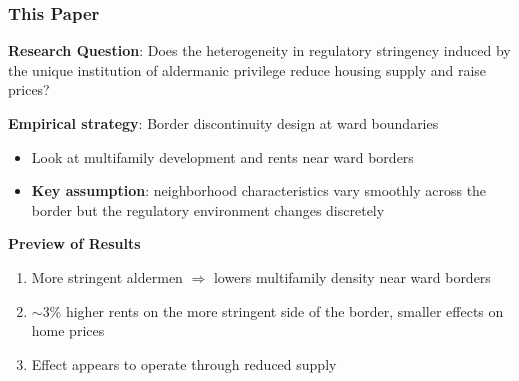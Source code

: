 \begin{frame}
	\frametitle{This Paper}
	\textbf{Research Question}: Does the heterogeneity in regulatory stringency induced by the unique institution of aldermanic privilege reduce housing supply and raise prices?

	\vspace{0.5em}
	\textbf{Empirical strategy}: Border discontinuity design at ward boundaries
	\begin{itemize}
		\item Look at multifamily development and rents near ward borders 
		\item \textbf{Key assumption}: neighborhood characteristics vary smoothly across the border but the regulatory environment changes discretely
	\end{itemize}

	\vspace{0.3em}
	\textbf{Preview of Results}
	\begin{enumerate}
		\item More stringent aldermen $\Rightarrow$ lowers multifamily density near ward borders
		\item $\sim$3\% higher rents on the more stringent side of the border, smaller effects on home prices
		\item Effect appears to operate through reduced supply
	\end{enumerate}
\end{frame}
